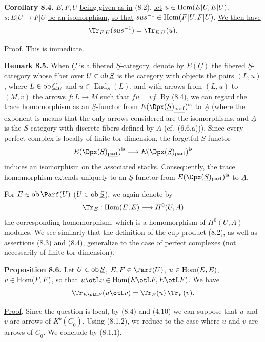 \textbf{Corollary 8.4.} \(E,F,U\) \uline{being given as in} (8.2), \uline{let} \(u\in\operatorname{Hom}(E|U,E|U)\), \(s:E|U\to F|U\) \uline{be an isomorphism}, \uline{so that} \(sus^{-1}\in\operatorname{Hom}(F|U,F|U)\). \uline{We then have}
\[
  \Tr_{F|U}(sus^{-1})=\Tr_{E|U}(u).
\]

\uline{Proof}. This is immediate.

\textbf{Remark 8.5.} When \(\underline{C}\) is a fibered \(\underline{S}\)-category, denote by \(E(\underline{C})\) the fibered \(\underline{S}\)-category whose fiber over \(U\in\operatorname{ob} \underline{S}\) is the category with objects the pairs \((L,u)\), where \(L\in\operatorname{ob}\underline{C}_U\) and \(u\in\operatorname{End}_{\underline{S}}(L)\), and with arrows from \((L,u)\) to \((M,v)\) the arrows \(f:L\to M\) such that \(fu=vf\). By (8.4), we can regard the trace homomorphism as an \(\underline{S}\)-functor from \(E(\Dpx(\underline{S})_{\underline{\parf}})^{\mathrm{is}}\) to \(\underline A\) (where the exponent \(\mathrm{is}\) means that the only arrows considered are the isomorphisms, and \(\underline A\) is the \(\underline{S}\)-category with discrete fibers defined by \(A\) (cf.\ (6.6.a))). Since every perfect complex is locally of finite tor-dimension, the forgetful \(\underline{S}\)-functor
\[
  E(\Dpx(\underline{S})_{\underline{\parf}})^{\mathrm{is}}
  \longrightarrow
  E(\Dpx(\underline{S})_{\parf})^{\mathrm{is}}
\]
induces an isomorphism on the associated stacks. Consequently, the trace
%
homomorphism extends uniquely to an \(\underline{S}\)-functor from \(E(\Dpx(\underline{S})_{\parf})^{\mathrm{is}}\) to \(\underline A\).

For \(E\in\Ob\Parf(U)\) (\(U\in\operatorname{ob} \underline{S}\)), we again denote by
\[
  \Tr_E:\Hom(E,E)\longrightarrow H^0(U,A)
\]
the corresponding homomorphism, which is a homomorphism of \(H^0(U,A)\)-modules. We see similarly that the definition of the cup-product (8.2), as well as assertions (8.3) and (8.4), generalize to the case of perfect complexes (not necessarily of finite tor-dimension).

\textbf{Proposition 8.6.} \uline{Let} \(U\in\operatorname{ob} \underline{S}\), \(E,F\in\Parf(U)\), \(u\in\operatorname{Hom}(E,E)\), \(v\in\operatorname{Hom}(F,F)\), \uline{so that} \(u\otL v\in\Hom(E\otL F,E\otL F)\). \uline{We have}
\[
  \Tr_{E\otL F}(u\otL v)=\Tr_E(u)\,\Tr_F(v).
\]

\uline{Proof}. Since the question is local, by (8.4) and (4.10) we can suppose that \(u\) and \(v\) are arrows of \(K^b(\underline{C}_0)\). Using (8.1.2), we reduce to the case where \(u\) and \(v\) are arrows of \(\underline{C}_0\). We conclude by (8.1.1).

